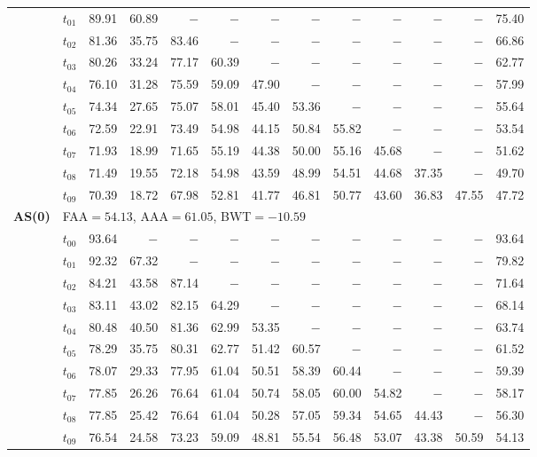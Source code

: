 \begin{table}[ht]
\begin{tabular}{@{}l l r r r r r r r r r r r@{}}
 & $t_{01}$ & 89.91 & 60.89 & $-$ & $-$ & $-$ & $-$ & $-$ & $-$ & $-$ & $-$ & 75.40 \\
 & $t_{02}$ & 81.36 & 35.75 & 83.46 & $-$ & $-$ & $-$ & $-$ & $-$ & $-$ & $-$ & 66.86 \\
 & $t_{03}$ & 80.26 & 33.24 & 77.17 & 60.39 & $-$ & $-$ & $-$ & $-$ & $-$ & $-$ & 62.77 \\
 & $t_{04}$ & 76.10 & 31.28 & 75.59 & 59.09 & 47.90 & $-$ & $-$ & $-$ & $-$ & $-$ & 57.99 \\
 & $t_{05}$ & 74.34 & 27.65 & 75.07 & 58.01 & 45.40 & 53.36 & $-$ & $-$ & $-$ & $-$ & 55.64 \\
 & $t_{06}$ & 72.59 & 22.91 & 73.49 & 54.98 & 44.15 & 50.84 & 55.82 & $-$ & $-$ & $-$ & 53.54 \\
 & $t_{07}$ & 71.93 & 18.99 & 71.65 & 55.19 & 44.38 & 50.00 & 55.16 & 45.68 & $-$ & $-$ & 51.62 \\
 & $t_{08}$ & 71.49 & 19.55 & 72.18 & 54.98 & 43.59 & 48.99 & 54.51 & 44.68 & 37.35 & $-$ & 49.70 \\
 & $t_{09}$ & 70.39 & 18.72 & 67.98 & 52.81 & 41.77 & 46.81 & 50.77 & 43.60 & 36.83 & 47.55 & 47.72 \\
\midrule
\multirow{11}{*}{\textbf{AS(0)}} & \multicolumn{12}{l}{\quad\small FAA$=54.13$,\; AAA$=61.05$,\; BWT$=-10.59$} \\
 & $t_{00}$ & 93.64 & $-$ & $-$ & $-$ & $-$ & $-$ & $-$ & $-$ & $-$ & $-$ & 93.64 \\
 & $t_{01}$ & 92.32 & 67.32 & $-$ & $-$ & $-$ & $-$ & $-$ & $-$ & $-$ & $-$ & 79.82 \\
 & $t_{02}$ & 84.21 & 43.58 & 87.14 & $-$ & $-$ & $-$ & $-$ & $-$ & $-$ & $-$ & 71.64 \\
 & $t_{03}$ & 83.11 & 43.02 & 82.15 & 64.29 & $-$ & $-$ & $-$ & $-$ & $-$ & $-$ & 68.14 \\
 & $t_{04}$ & 80.48 & 40.50 & 81.36 & 62.99 & 53.35 & $-$ & $-$ & $-$ & $-$ & $-$ & 63.74 \\
 & $t_{05}$ & 78.29 & 35.75 & 80.31 & 62.77 & 51.42 & 60.57 & $-$ & $-$ & $-$ & $-$ & 61.52 \\
 & $t_{06}$ & 78.07 & 29.33 & 77.95 & 61.04 & 50.51 & 58.39 & 60.44 & $-$ & $-$ & $-$ & 59.39 \\
 & $t_{07}$ & 77.85 & 26.26 & 76.64 & 61.04 & 50.74 & 58.05 & 60.00 & 54.82 & $-$ & $-$ & 58.17 \\
 & $t_{08}$ & 77.85 & 25.42 & 76.64 & 61.04 & 50.28 & 57.05 & 59.34 & 54.65 & 44.43 & $-$ & 56.30 \\
 & $t_{09}$ & 76.54 & 24.58 & 73.23 & 59.09 & 48.81 & 55.54 & 56.48 & 53.07 & 43.38 & 50.59 & 54.13 \\

\end{tabular}
\end{table}
